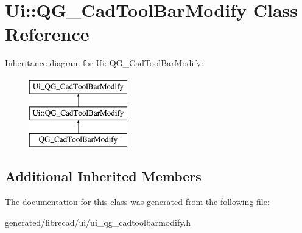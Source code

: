 \hypertarget{classUi_1_1QG__CadToolBarModify}{\section{Ui\-:\-:Q\-G\-\_\-\-Cad\-Tool\-Bar\-Modify Class Reference}
\label{classUi_1_1QG__CadToolBarModify}
}
Inheritance diagram for Ui\-:\-:Q\-G\-\_\-\-Cad\-Tool\-Bar\-Modify\-:\begin{figure}[H]
\begin{center}
\leavevmode
\includegraphics[height=3.000000cm]{classUi_1_1QG__CadToolBarModify}
\end{center}
\end{figure}
\subsection*{Additional Inherited Members}


The documentation for this class was generated from the following file\-:\begin{DoxyCompactItemize}
\item 
generated/librecad/ui/ui\-\_\-qg\-\_\-cadtoolbarmodify.\-h\end{DoxyCompactItemize}
